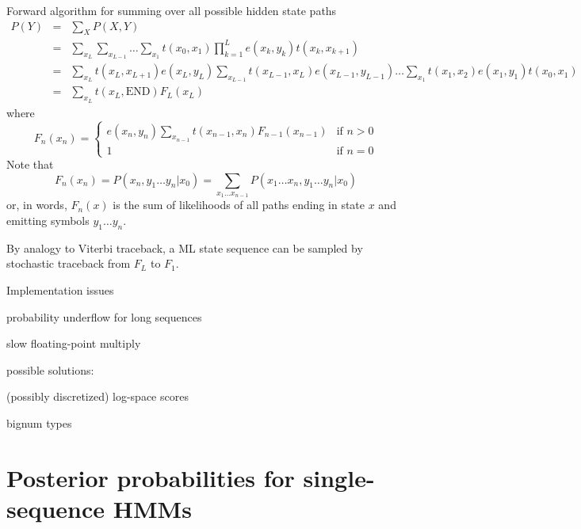 \documentclass{beamer}
\begin{document}
\begin{frame}{}
\tiny
Forward algorithm for summing over all possible hidden state paths
\begin{eqnarray*}
P(Y) & = & \sum_X P(X,Y) \\
& = & \sum_{x_L} \sum_{x_{L-1}} \ldots \sum_{x_1} t(x_0,x_1) \prod_{k=1}^L e(x_k,y_k) t(x_k,x_{k+1}) \\
& = & \sum_{x_L} t(x_L,x_{L+1}) e(x_L,y_L) \sum_{x_{L-1}} t(x_{L-1},x_L) e(x_{L-1},y_{L-1}) \ldots \sum_{x_1} t(x_1,x_2) e(x_1,y_1) t(x_0,x_1) \\
& = & \sum_{x_L} t(x_L,\mbox{END}) F_L(x_L)
\end{eqnarray*}
where
\[
F_n(x_n) = \left\{ \begin{array}{ll} \displaystyle
e(x_n,y_n) \sum_{x_{n-1}} t(x_{n-1},x_n) F_{n-1}(x_{n-1}) & \mbox{if $n > 0$} \\
1 & \mbox{if $n=0$}
\end{array} \right.
\]
Note that
\[
F_n(x_n) = P(x_n, y_1 \ldots y_n | x_0) = \sum_{x_1 \ldots x_{n-1}} P(x_1 \ldots x_n, y_1 \ldots y_n | x_0)
\]
or, in words, $F_n(x)$ is the sum of likelihoods of all paths ending in state $x$ and emitting symbols $y_1 \ldots y_n$.

By analogy to Viterbi traceback, a ML state sequence can be sampled by
stochastic traceback from $F_L$ to $F_1$.
\end{frame}

\begin{frame}{}
Implementation issues
 \itemb
 \item probability underflow for long sequences
 \item slow floating-point multiply
 \item possible solutions:
  \itemb
  \item (possibly discretized) log-space scores
  \item bignum types
  \iteme
 \iteme
\end{frame}

\section{Posterior probabilities for single-sequence HMMs}
\end{document}
